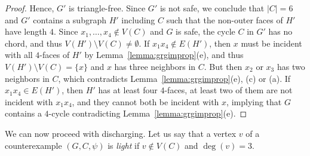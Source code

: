 \documentclass[12pt,twoside,openright,a4paper]{book}
\begin{document}
\begin{proof}
Hence, $G'$ is triangle-free.  Since $G'$ is not safe, we conclude that $|C|=6$ and $G'$ contains a subgraph $H'$ including $C$
such that the non-outer faces of $H'$ have length $4$.  Since $x_1,\ldots, x_4\not\in V(C)$ and $G$ is safe, the
cycle $C$ in $G'$ has no chord, and thus $V(H')\setminus V(C)\neq\emptyset$.  If $x_1x_4\not\in E(H')$, then
$x$ must be incident with all $4$-faces of $H'$ by Lemma~\ref{lemma:grgimprop}(e), and thus $V(H')\setminus V(C)=\{x\}$
and $x$ has three neighbors in $C$.  But then $x_2$ or $x_3$ has two neighbors in $C$, which contradicts
Lemma~\ref{lemma:grgimprop}(e), (c) or (a).  If $x_1x_4\in E(H')$, then $H'$ has at least four $4$-faces,
at least two of them are not incident with $x_1x_4$, and they cannot both be incident with $x$, implying that $G$ contains
a $4$-cycle contradicting Lemma~\ref{lemma:grgimprop}(e).
\end{proof}

We can now proceed with discharging.  Let us say that a vertex $v$ of a counterexample $(G,C,\psi)$ is \emph{light}
if $v\not\in V(C)$ and $\deg(v)=3$.
\end{document}
